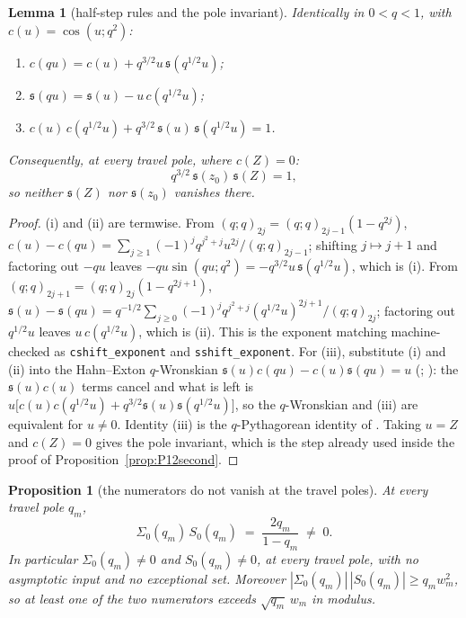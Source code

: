 \documentclass[11pt]{article}
\theoremstyle{plain}
\newtheorem{lemma}[theorem]{Lemma}
\newtheorem{proposition}[theorem]{Proposition}
\theoremstyle{definition}
\theoremstyle{remark}
\begin{document}
\begin{lemma}[half-step rules and the pole invariant]\label{lem:halfstep}
Identically in $0<q<1$, with $c(u)=\cos(u;q^2)$:
\begin{enumerate}[label=\textup{(\roman*)},leftmargin=2.2em,itemsep=0.1em,topsep=0.2em]
\item $c(qu)=c(u)+q^{3/2}u\,\mathfrak s(q^{1/2}u)$;
\item $\mathfrak s(qu)=\mathfrak s(u)-u\,c(q^{1/2}u)$;
\item $c(u)\,c(q^{1/2}u)+q^{3/2}\,\mathfrak s(u)\,\mathfrak s(q^{1/2}u)=1$.
\end{enumerate}
Consequently, at every travel pole, where $c(Z)=0$:
\[
   q^{3/2}\,\mathfrak s(z_0)\,\mathfrak s(Z)=1 ,
\]
so neither $\mathfrak s(Z)$ nor $\mathfrak s(z_0)$ vanishes there.
\end{lemma}

\begin{proof}
(i) and (ii) are termwise. From $(q;q)_{2j}=(q;q)_{2j-1}(1-q^{2j})$,
$c(u)-c(qu)=\sum_{j\ge1}(-1)^jq^{j^2+j}u^{2j}/(q;q)_{2j-1}$; shifting $j\mapsto j+1$ and factoring
out $-qu$ leaves $-qu\sin(qu;q^2)=-q^{3/2}u\,\mathfrak s(q^{1/2}u)$, which is (i). From
$(q;q)_{2j+1}=(q;q)_{2j}(1-q^{2j+1})$,
$\mathfrak s(u)-\mathfrak s(qu)=q^{-1/2}\sum_{j\ge0}(-1)^jq^{j^2+j}(q^{1/2}u)^{2j+1}/(q;q)_{2j}$;
factoring out $q^{1/2}u$ leaves $u\,c(q^{1/2}u)$, which is (ii). This is the exponent
matching machine-checked as \texttt{cshift\_exponent} and \texttt{sshift\_exponent}. For (iii),
substitute (i) and (ii) into the Hahn--Exton $q$-Wronskian
$\mathfrak s(u)c(qu)-c(u)\mathfrak s(qu)=u$ (\cite[eq.~(4.3.8)]{Swarttouw1992};
\cite[eq.~(4.21)]{Daalhuis1994}): the $\mathfrak s(u)c(u)$ terms cancel and what is left is
$u\bigl[c(u)c(q^{1/2}u)+q^{3/2}\mathfrak s(u)\mathfrak s(q^{1/2}u)\bigr]$, so the $q$-Wronskian and
(iii) are equivalent for $u\ne0$. Identity (iii) is the $q$-Pythagorean identity of
\cite{KS1992}. Taking $u=Z$ and $c(Z)=0$ gives the pole invariant, which is the step already used
inside the proof of Proposition~\ref{prop:P12second}.
\end{proof}

\begin{proposition}[the numerators do not vanish at the travel poles]\label{prop:numnonvanish}
At every travel pole $q_m$,
\begin{equation}\label{eq:numprod}
   \Sigma_0(q_m)\,S_0(q_m)\;=\;\frac{2q_m}{1-q_m}\;\ne\;0 .
\end{equation}
In particular $\Sigma_0(q_m)\ne0$ and $S_0(q_m)\ne0$, at \emph{every} travel pole, with no
asymptotic input and no exceptional set. Moreover $|\Sigma_0(q_m)|\,|S_0(q_m)|\ge q_mw_m^2$, so at
least one of the two numerators exceeds $\sqrt{q_m}\,w_m$ in modulus.
\end{proposition}
\end{document}
